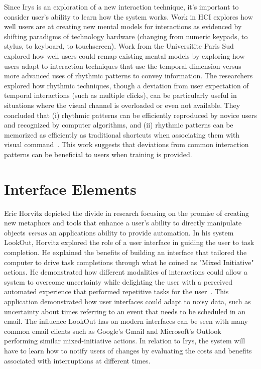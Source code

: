 Since Irys is an exploration of a new interaction technique, it's important to
consider user's ability to learn how the system works. Work in HCI explores how
well users are at creating new mental models for interactions as evidenced by
shifting paradigms of technology hardware (changing from numeric keypads, to
stylus, to keyboard, to touchscreen).  Work from the Universitite Paris Sud
explored how well users could remap existing mental models by exploring how
users adapt to interaction techniques that use the temporal dimension versus
more advanced uses of rhythmic patterns to convey information.  The researchers
explored how rhythmic techniques, though a deviation from  user expectation of
temporal interactions (such as multiple clicks), can be particularly useful in
situations where the visual channel is overloaded or even not available.  They
concluded that  (i) rhythmic patterns can be efficiently reproduced by novice
users and recognized by computer algorithms, and (ii) rhythmic patterns can be
memorized as efficiently as traditional shortcuts when associating them with
visual command~\cite{ghomi2012using}.  This work suggests that deviations from
common interaction patterns can be beneficial to users when training is
provided.

\section{                  Interface Elements                                }

Eric Horvitz depicted the divide in research focusing on the promise of creating
new metaphors and tools that enhance a user's ability to directly manipulate
objects \textit{versus} an applications ability to provide automation. In his
system LookOut, Horvitz explored the role of a user interface in guiding the
user to task completion.  He explained the benefits of building an interface
that tailored the computer to drive task completions through what he coined as
"Mixed Initiative" actions.  He demonstrated how different modalities of
interactions could allow a system to overcome uncertainty while delighting the
user with a perceived automated experience that performed repetitive tasks for
the user~\cite{horvitz1999principles}.  This application demonstrated how user
interfaces could adapt to noisy data, such as uncertainty about times referring
to an event that needs to be scheduled in an email. The influence LookOut has on
modern interfaces can be seen with many common email clients such as Google's
Gmail and Microsoft's Outlook performing similar mixed-initiative actions.  In
relation to Irys, the system will have to learn how to notify users of changes
by evaluating the costs and benefits associated with interruptions at different
times.

